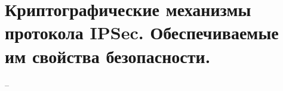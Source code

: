 
\section{Криптографические механизмы протокола IPSec. Обеспечиваемые им свойства безопасности.}

--